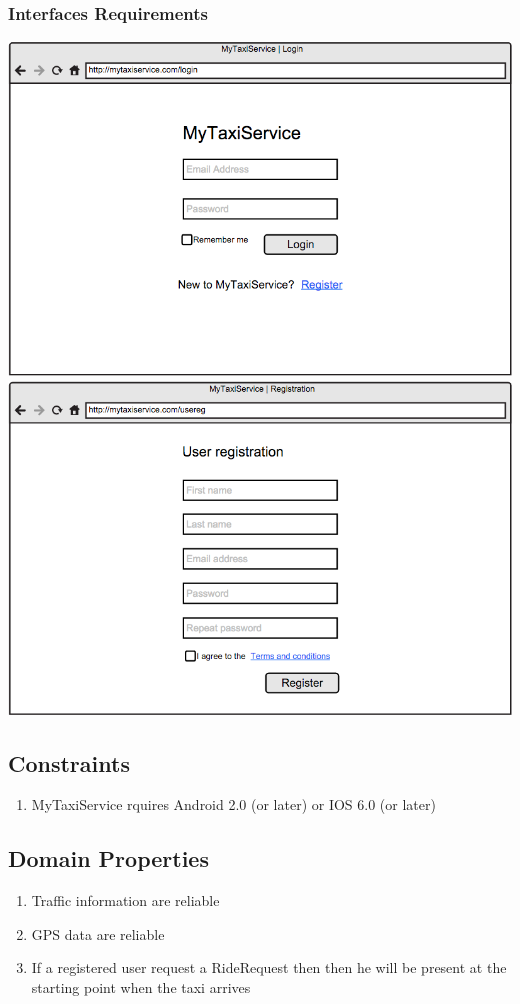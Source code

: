 \documentclass[11pt]{article} %
\begin{document}
      \subsubsection{Interfaces Requirements}
        \includegraphics[scale=0.52]{loginInt.png}\newline
        \includegraphics[scale=0.52]{userRegInt.png}\newline

    \subsection{Constraints}
	\begin{enumerate}
	      \item MyTaxiService rquires Android 2.0 (or later) or IOS 6.0 (or later)
	\end{enumerate}

    \subsection {Domain Properties}
	\begin{enumerate}
	      \item Traffic information are reliable
	      \item GPS data are reliable
	      \item If a registered user request a RideRequest then then he will be present at the starting point when the taxi arrives
	\end{enumerate}
\end{document}
